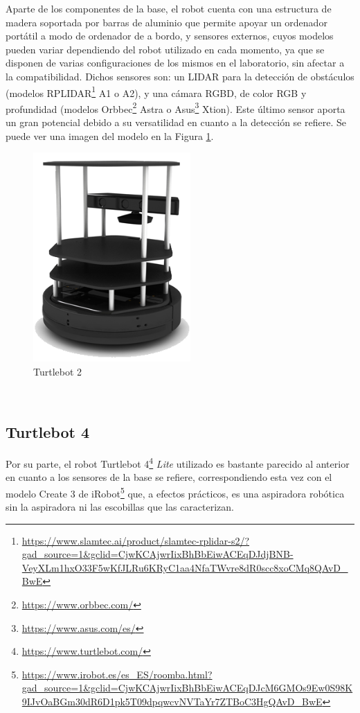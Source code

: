 Aparte de los componentes de la base, el robot cuenta con una estructura de
madera soportada por barras de aluminio que permite apoyar un ordenador
portátil a modo de ordenador de a bordo, y sensores externos, cuyos modelos
pueden variar dependiendo del robot utilizado en cada momento, ya que se
disponen de varias configuraciones de los mismos en el laboratorio, sin afectar
a la compatibilidad.
Dichos sensores son: un LIDAR para la detección de obstáculos (modelos
RPLIDAR\footnote{\url{https://www.slamtec.ai/product/slamtec-rplidar-s2/?gad_source=1&gclid=CjwKCAjwrIixBhBbEiwACEqDJdjBNB-VeyXLm1hxO33F5wKfJLRu6KRyC1aa4NfaTWvre8dR0scc8xoCMq8QAvD_BwE}}
A1 o A2), y una cámara RGBD, de color RGB y profundidad (modelos
Orbbec\footnote{\url{https://www.orbbec.com/}} Astra o
Asus\footnote{\url{https://www.asus.com/es/}} Xtion).
Este último sensor aporta un gran potencial debido a su versatilidad en cuanto a
la detección se refiere.
Se puede ver una imagen del modelo en la Figura \ref{fig:turtlebot2}.
\\

\begin{figure} [h!]
  \begin{center}
    \includegraphics[width=6cm]{figs/turtlebot2}
  \end{center}
  \caption{Turtlebot 2 \cite{turtlebot4}}
  \label{fig:turtlebot2}
\end{figure}\


\subsection{Turtlebot 4}
\label{sec:turtlebot4}

Por su parte, el robot Turtlebot 4\footnote{\url{https://www.turtlebot.com/}}
\textit{Lite} utilizado es bastante parecido al anterior en cuanto a los
sensores de la base se refiere, correspondiendo esta vez con el modelo Create 3
de iRobot\footnote{
\url{https://www.irobot.es/es_ES/roomba.html?gad_source=1&gclid=CjwKCAjwrIixBhBbEiwACEqDJcM6GMOs9Ew0S98K9IJvOaBGm30dR6D1pk5T09dpqwcvNVTaYr7ZTBoC3HgQAvD_BwE}}
que, a efectos prácticos, es una aspiradora robótica sin la aspiradora ni las
escobillas que las caracterizan.
\\

